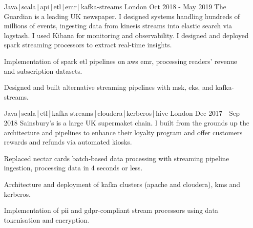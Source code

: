 \begin{cventries}
    \cventry
    {Java\,|\,scala\,|\,api\,|\,etl\,|\,emr\,|\,kafka-streams}
    {} 
    {London}
    {Oct 2018 - May 2019}
    {The Guardian is a leading UK newspaper. I designed systems handling hundreds of millions of events, ingesting data from kinesis streams into elastic search via logstash. I used Kibana for monitoring and observability. I designed and deployed spark streaming processors to extract real-time insights.}
    {
        \begin{cvitems}
            \item{Implementation of spark etl pipelines on aws emr, processing readers' revenue and subscription datasets.}
            \item{Designed and built alternative streaming pipelines with msk, eks, and kafka-streams.}
        \end{cvitems}
    }

    \cventry
    {Java\,|\,scala\,|\,etl\,|\,kafka-streams\,|\,cloudera\,|\,kerberos\,|\,hive}
    {} 
    {London}
    {Dec 2017 - Sep 2018}
    {Sainsbury's is a large UK supermaket chain. I built from the grounds up the architecture and pipelines to enhance their loyalty program and offer customers rewards and refunds via automated kiosks.}
    {
        \begin{cvitems}
            \item{Replaced nectar cards batch-based data processing with streaming pipeline ingestion, processing data in 4 seconds or less.}
            \item{Architecture and deployment of kafka clusters (apache and cloudera), kms and kerberos.}
            \item{Implementation of pii and gdpr-compliant stream processors using data tokenisation and encryption.}
        \end{cvitems}
    }


\end{cventries}
